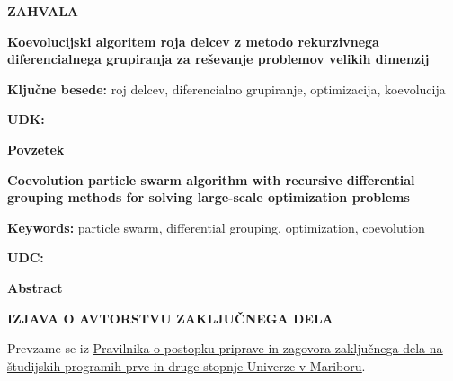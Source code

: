 \documentclass[openany, a4paper, 12pt]{book}
\newcommand{\atitleslo}{Koevolucijski algoritem roja delcev z metodo rekurzivnega diferencialnega grupiranja za reševanje problemov velikih dimenzij}
\newcommand{\atitleen}{Coevolution particle swarm algorithm with recursive differential grouping methods for solving large-scale optimization problems}
\newcommand{\akljucne}{roj delcev, diferencialno grupiranje, optimizacija, koevolucija}
\newcommand{\akeywords}{particle swarm, differential grouping, optimization, coevolution}
\begin{document}
\newpage
\vspace*{8cm}
\hspace{6.2cm}
\begin{minipage}[b]{8.0cm}
\begin{flushright}
    {\Large\textbf{ZAHVALA}}\\ 
\end{flushright}
\vspace{0.3cm}

\end{minipage}
\vfill

\newpage
\textbf{\Large \atitleslo} %
\vspace*{2.0cm}

\textbf{Ključne besede:} \akljucne %
\vspace*{2.0cm}

\textbf{UDK:} %
\vspace*{2.0cm}

\textbf{Povzetek} %
\\


\newpage
\begin{otherlanguage}{english}
\textbf{\Large \atitleen} %
\vspace*{2.0cm}

\textbf{Keywords:} \akeywords %
\vspace*{2.0cm}

\textbf{UDC:} %
\vspace*{2.0cm}

\textbf{Abstract} %
\\

\end{otherlanguage}

\newpage
\begin{center}
    \textbf{IZJAVA O AVTORSTVU ZAKLJUČNEGA DELA}
\end{center}

Prevzame se iz \href{https://www.um.si/univerza/dokumentni-center/akti/GlavniDokumenti2013/Pravilnik\%20o\%20zaklj.\%20delih\%20na\%20\%C5\%A0P\%201.\%20in\%202.\%20st.\%20UM\%20(UPB\%201).pdf}{\ul{Pravilnika o postopku priprave in zagovora zaključnega dela na študijskih programih prve in druge stopnje Univerze v Mariboru}}.
\end{document}

